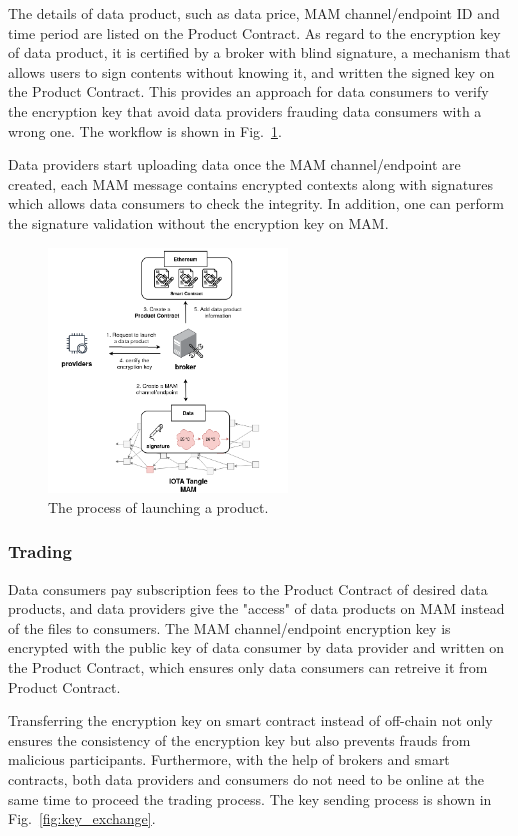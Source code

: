 \documentclass[conference]{IEEEtran}
\begin{document}
The details of data product, such as data price, MAM channel/endpoint ID and time period are listed on the Product Contract. As regard to the encryption key of data product, it is certified by a broker with blind signature\cite{blindSig}, a mechanism that allows users to sign contents without knowing it, and written the signed key on the Product Contract. This provides an approach for data consumers to verify the encryption key that avoid data providers frauding data consumers with a wrong one. The workflow is shown in Fig.~\ref{fig:launching_product}. 

Data providers start uploading data once the MAM channel/endpoint are created, each MAM message contains encrypted contexts along with signatures which allows data consumers to check the integrity. In addition, one can perform the signature validation without the encryption key on MAM.
 
\begin{figure}[!t]
    \centering
    \includegraphics[width=2.5in]{launching_product}
    \caption{The process of launching a product.}
    \label{fig:launching_product}
\end{figure}

\subsubsection{Trading}
Data consumers pay subscription fees to the Product Contract of desired data products, and data providers give the "access" of data products on MAM instead of the files to consumers. The MAM channel/endpoint encryption key is encrypted with the public key of data consumer by data provider and written on the Product Contract, which ensures only data consumers can retreive it from Product Contract. 

Transferring the encryption key on smart contract instead of off-chain not only ensures the consistency of the encryption key but also prevents frauds from malicious participants. Furthermore, with the help of brokers and smart contracts, both data providers and consumers do not need to be online at the same time to proceed the trading process. The key sending process is shown in Fig.~\ref{fig:key_exchange}. 
\end{document}
